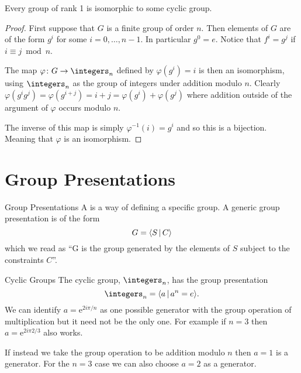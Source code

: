 \documentclass[fleqn]{NotesClass}
\newcommand*{\e}{\mathrm{e}}
\begin{document}
    \begin{lma}{}{}
        Every group of rank 1 is isomorphic to some cyclic group.
        
        \begin{proof}
            First suppose that \(G\) is a finite group of order \(n\).
            Then elements of \(G\) are of the form \(g^i\) for some \(i = 0, \dotsc, n - 1\).
            In particular \(g^0 = e\).
            Notice that \(f^i = g^j\) if \(i \equiv j \bmod n\).
            
            The map \(\varphi\colon G \to \integers_n\) defined by \(\varphi(g^i) = i\) is then an isomorphism, using \(\integers_n\) as the group of integers under addition modulo \(n\).
            Clearly \(\varphi(g^{i}g^{j}) = \varphi(g^{i + j}) = i + j = \varphi(g^i) + \varphi(g^j)\) where addition outside of the argument of \(\varphi\) occurs modulo \(n\).
            
            The inverse of this map is simply \(\varphi^{-1}(i) = g^i\) and so this is a bijection.
            Meaning that \(\varphi\) is an isomorphism.
        \end{proof}
    \end{lma}
    
    \section{Group Presentations}
    \begin{dfn}{Group Presentations}{}
        A  is a way of defining a specific group.
        A generic group presentation is of the form
        \begin{equation}
            G = \presentation{S}{C}
        \end{equation}
        which we read as \enquote{G is the group generated by the elements of \(S\) subject to the constraints \(C\)}.
    \end{dfn}
    
    \begin{exm}{Cyclic Groups}{}
        The cyclic group, \(\integers_n\), has the group presentation
        \begin{equation}
            \integers_n = \presentation{a}{a^n = e}.
        \end{equation}
        We can identify \(a = \e^{2i\pi/n}\) as one possible generator with the group operation of multiplication but it need not be the only one.
        For example if \(n = 3\) then \(a = \e^{2i\pi 2/3}\) also works.
        
        If instead we take the group operation to be addition modulo \(n\) then \(a = 1\) is a generator.
        For the \(n = 3\) case we can also choose \(a = 2\) as a generator.
    \end{exm}
    
\end{document}

